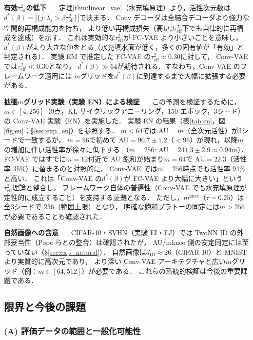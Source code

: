 \documentclass[11pt,a4paper]{jsarticle}
\newcommand{\mknee}{m^{\mathrm{knee}}}
\begin{document}
\textbf{有効$\tau^2_\mathrm{eff}$の低下}~~~
定理\ref{thm:linear_vae}（水充填原理）より，活性次元数は
$d^*(\beta) = |\{j : \lambda_j > \beta\tau^2_\mathrm{eff}\}|$で決まる．
Conv デコーダは全結合デコーダより強力な空間的再構成能力を持ち，
より低い再構成損失（高い$\beta\tau^2_\mathrm{eff}$下でも自律的に再構成を達成）を示す．
これは実効的な$\tau^2_\mathrm{eff}$が FC-VAE より小さいことを意味し，
$d^*(\beta)$がより大きな値をとる（水充填水面が低く，多くの固有値が「有効」と判定される）．
実験 EM で推定した FC-VAE の$\tau^2_\mathrm{eff} \approx 0.30$に対して，
Conv-VAE では$\tau^2_\mathrm{eff} \ll 0.30$となり，
$d^*(\beta) \gg 64$が期待される．すなわち，Conv-VAE のフレームワーク適用には
$m$グリッドを$d^*(\beta)$に到達するまで大幅に拡張する必要がある．

\textbf{拡張$m$グリッド実験（実験 EN）による検証}~~~
この予測を検証するために，$m \in [4, 256]$（9点，KL サイクリックアニーリング，150 エポック，3シード）
の Conv-VAE 実験（EN）を実施した．
実験 EN の結果（表\ref{tab:en}，図\ref{fig:en}；§\ref{sec:exp_en}）を参照する．
$m \leq 64$では AU$=m$（全次元活性）が3シードで一致するが，
$m = 96$で初めて AU$=90.7\pm1.2$（$<96$）が現れ，以降$m$の増加に伴い活性率が徐々に低下する
（$m=256$: AU$=241.3\pm2.9 \approx 0.94m$）．
FC-VAE ではすでに$m=12$付近で AU 飽和が始まり$m=64$で AU$=22.3$（活性率 35\%）に留まるのと対照的に，
Conv-VAE では$m=256$時点でも活性率 94\%と高い．
これは「Conv-VAE の$d^*(\beta)$が FC-VAE より大幅に大きい」という$\tau^2_\mathrm{eff}$理論と整合し，
フレームワーク自体の普遍性（Conv-VAE でも水充填原理が定性的に成立すること）を支持する証拠となる．
ただし，$\mknee$（$\tau=0.25$）は全3シードで 256（範囲上限）となり，
明確な飽和プラトーの同定には$m > 256$が必要であることも確認された．


\textbf{自然画像への含意}~~~
CIFAR-10・SVHN（実験 EI・EJ）では TwoNN ID の外部妥当性（Pope ら\cite{pope2021intrinsic}との整合）は確認されたが，
AU/mknee 側の安定同定には至っていない（§\ref{sec:exp_natural}）．
自然画像は$d_\mathrm{ID} \approx 26$（CIFAR-10）と MNIST より実質的に高次元であり，
より深い Conv-VAE アーキテクチャと広い$m$グリッド（例：$m \in [64, 512]$）が必要である．
これらの系統的検証は今後の重要課題である．

\subsection{限界と今後の課題}\label{sec:disc_limitation}

\subsubsection*{(A) 評価データの範囲と一般化可能性}
\end{document}
